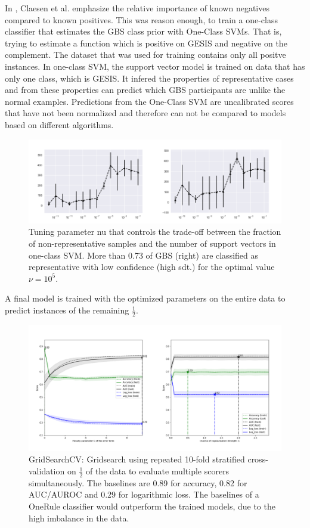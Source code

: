 In \cite{claesen2}, Claesen et al. emphasize the relative importance of known negatives compared to known positives. This was reason enough, to train a one-class classifier that estimates the GBS class prior with One-Class SVMs. That is, trying to estimate a function which is positive on GESIS and negative on the complement. The dataset that was used for training contains only all positve instances. In one-class SVM, the support vector model is trained on data that has only one class, which is GESIS. It infered the properties of representative cases and from these properties can predict which GBS participants are unlike the normal examples. Predictions from the One-Class SVM are uncalibrated scores that have not been normalized and therefore can not be compared to models based on different algorithms.

\begin{figure}[ht]
\centering
   \includegraphics[scale=0.38,angle=0]{fig/occfigure}
\captionsetup{width= 380pt}
\caption{Tuning parameter nu that controls the trade-oﬀ between the fraction of non-representative samples and the number of support vectors in one-class SVM. More than 0.73 of GBS (right) are classiﬁed as representative with low conﬁdence (high sdt.) for the optimal value \( \nu = 10^5\).}
   \label{fig:Ng1} 
\end{figure}

A final model is trained with the optimized parameters on the entire data to predict instances of the remaining \(\frac{1}{2}\).

\begin{figure}[ht]
\centering
   \includegraphics[scale=0.38,angle=0]{fig/gridfigure}
\captionsetup{width= 400pt}
\caption{GridSearchCV: Gridsearch using repeated 10-fold stratified cross-validation on \(\frac{1}{2}\) of the data to evaluate multiple scorers simultaneously. The baselines are 0.89 for accuracy, 0.82 for AUC/AUROC and 0.29 for logarithmic loss. The baselines of a OneRule classifier would outperform the trained models, due to the high imbalance in the data.}
   \label{fig:Ng1} 
\end{figure}

